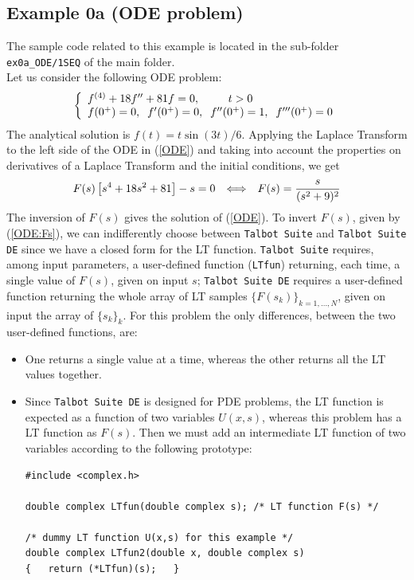 \documentclass[a4paper,10pt]{report}%
\begin{document}
\subsection{Example 0a (ODE problem)}\label{EXAMPLE:0a}
The sample code related to this example is located in the sub-folder {\tt ex0a\_ODE/1SEQ} of the main
folder.
\\
Let us consider the following ODE problem:
\begin{equation}\label{ODE}
\left\{\begin{array}{lcl}
  f^{(4)} + 18f'' + 81f = 0, &\hspace*{.25cm}& t>0 \\
  \multicolumn{3}{l}{f(0^+)=0,\;\;f'(0^+)=0,\;\;f''(0^+)=1,\;\;f'''(0^+)=0}
\end{array}\right.
\end{equation}
The analytical solution is $f(t)=t\sin(3t)/6$.
Applying the Laplace Transform to the left side of the ODE in (\ref{ODE}) and taking into account the
properties on derivatives of a Laplace Transform and the initial conditions, we get
\begin{equation}\label{ODE:Fs}
F(s)\left[s^4+18s^2+81\right]-s = 0 \hspace*{.25cm}\Longleftrightarrow\hspace*{.25cm}
F(s) = \frac{s}{(s^2+9)^2}
\end{equation}
The inversion of $F(s)$ gives the solution of (\ref{ODE}).
To invert $F(s)$, given by (\ref{ODE:Fs}), we can indifferently choose between {\tt Talbot Suite} and
{\tt Talbot Suite DE} since we have a closed form for the LT function.
{\tt Talbot Suite} requires, among input parameters, a user-defined function ({\tt LTfun}) returning,
each time, a single value of $F(s)$, given on input $s$; {\tt Talbot Suite DE} requires a user-defined
function returning the whole array of LT samples $\{F(s_k)\}_{k=1,\ldots,N}$, given on input the array
of $\{s_k\}_k$.
For this problem the only differences, between the two user-defined functions, are:
\begin{itemize}
\item One returns a single value at a time, whereas the other returns all the LT values together.
\item Since {\tt Talbot Suite DE} is designed for PDE problems, the LT function is expected as a function of
two variables $U(x,s)$, whereas this problem has a LT function as $F(s)$. Then we must add an intermediate LT
function of two variables according to the following prototype:
\begin{lstlisting}
#include <complex.h>

double complex LTfun(double complex s); /* LT function F(s) */

/* dummy LT function U(x,s) for this example */
double complex LTfun2(double x, double complex s)
{   return (*LTfun)(s);   }
\end{lstlisting}
\end{itemize}
\end{document}
